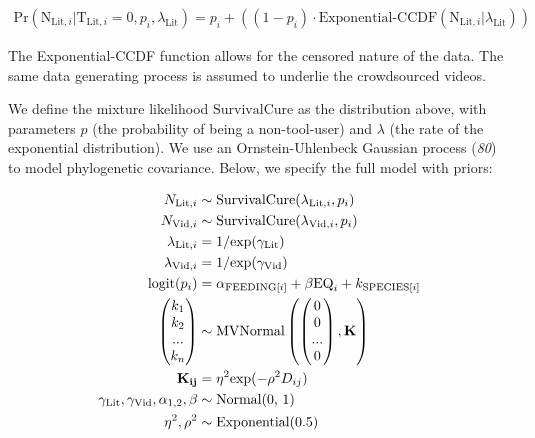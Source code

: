 \documentclass[
  man,floatsintext]{apa6}
\begin{document}
\begin{align}
\text{Pr}(\text{N}_{\text{Lit},i}|\text{T}_{\text{Lit},i} = 0,p_i,\lambda_\text{Lit}) = p_i + ((1-p_i)\cdot\text{Exponential-CCDF}(\text{N}_{\text{Lit},i}|\lambda_\text{Lit}))
\end{align}

The Exponential-CCDF function allows for the censored nature of the data. The
same data generating process is assumed to underlie the crowdsourced videos.

We define the mixture likelihood \(\text{SurvivalCure}\) as the distribution
above, with parameters \(p\) (the probability of being a non-tool-user)
and \(\lambda\) (the rate of the exponential distribution). We use an
Ornstein-Uhlenbeck Gaussian process (\emph{80}) to model phylogenetic
covariance. Below, we specify the full model with priors:

\begin{align}
N_{\text{Lit},i} &\sim \text{SurvivalCure}(\lambda_{\text{Lit},i}, p_{i}) \\
N_{\text{Vid},i} &\sim \text{SurvivalCure}(\lambda_{\text{Vid},i}, p_{i}) \nonumber \\
\lambda_{\text{Lit},i} &= 1 / \text{exp}(\gamma_\text{Lit}) \nonumber \\
\lambda_{\text{Vid},i} &= 1 / \text{exp}(\gamma_\text{Vid}) \nonumber \\
\text{logit}(p_{i}) &= \alpha_{\text{FEEDING}[i]} + \beta\text{EQ}_{i} +  k_{\text{SPECIES}[i]} \nonumber \\
\begin{pmatrix}k_{1}\\k_{2}\\...\\k_{n}\\\end{pmatrix}
&\sim \text{MVNormal}
\begin{pmatrix}\begin{pmatrix}0\\0\\...\\0\\\end{pmatrix},\bf{K}\end{pmatrix} \nonumber \\
\bf{K}_{ij} &= \eta^2\text{exp}(-\rho^2D_{ij}) \nonumber \\
\gamma_\text{Lit}, \gamma_\text{Vid}, \alpha_{1,2}, \beta &\sim \text{Normal(0, 1)} \nonumber \\
\eta^2, \rho^2 &\sim \text{Exponential(0.5)} \nonumber
\end{align}
\end{document}
